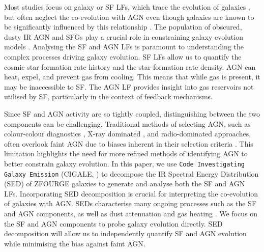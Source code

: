 Most studies focus on galaxy or SF LFs, which trace the evolution of galaxies \citep{tempel_tracing_2011, cool_galaxy_2012}, but often neglect the co-evolution with AGN \citep{fotopoulou_5-10_2016, symeonidis_agn_2021, finkelstein_coevolution_2022} even though galaxies are known to be significantly influenced by this relationship \citep{hopkins_cosmological_2008, fiore_agn_2017}. The population of obscured, dusty IR AGN and SFGs play a crucial role in constraining galaxy evolution models \citep{gruppioni_modelling_2011}. Analysing the SF and AGN LFs is paramount to understanding the complex processes driving galaxy evolution. SF LFs allow us to quantify the cosmic star formation rate history and the star-formation rate density. AGN can heat, expel, and prevent gas from cooling. This means that while gas is present, it may be inaccessible to SF. The AGN LF provides insight into gas reservoirs not utilised by SF, particularly in the context of feedback mechanisms. 

Since SF and AGN activity are so tightly coupled, distinguishing between the two components can be challenging. Traditional methods of selecting AGN, such as colour-colour diagnostics \citep{lacy_obscured_2004}, X-ray dominated \citep{szokoly_chandra_2004}, and radio-dominated \citep{rees_radio_2016} approaches, often overlook faint AGN due to biases inherent in their selection criteria \citep{thorne_deep_2022}. This limitation highlights the need for more refined methods of identifying AGN to better constrain galaxy evolution. In this paper, we use \texttt{Code Investigating Galaxy Emission} (CIGALE, \citealp{burgarella_star_2005, noll_analysis_2009, boquien_cigale_2019}) to decompose the IR Spectral Energy Distribution (SED) of ZFOURGE galaxies \citep{straatman_fourstar_2016} to generate and analyse both the SF and AGN LFs. Incorporating SED decomposition is crucial for interpreting the co-evolution of galaxies with AGN. SEDs characterise many ongoing processes such as the SF and AGN components, as well as dust attenuation and gas heating \citep{ho_spectral_1999, huang_local_2007, silva_modelling_2011, gruppioni_modelling_2011}. We focus on the SF and AGN components to probe galaxy evolution directly. SED decomposition will allow us to independently quantify SF and AGN evolution while minimising the bias against faint AGN.

